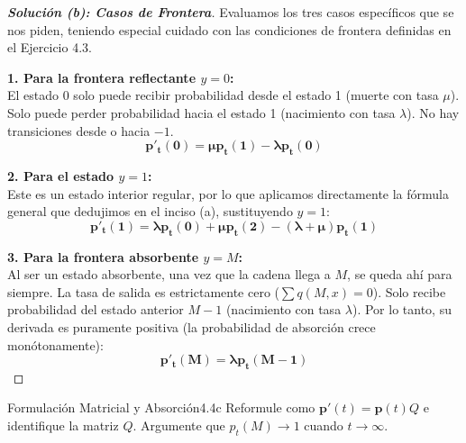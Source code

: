 \documentclass[10pt,a4paper]{article}
\begin{document}
\newpage

\begin{proof}[\textbf{Solución (b): Casos de Frontera}]
    Evaluamos los tres casos específicos que se nos piden, teniendo especial cuidado con las condiciones de frontera definidas en el Ejercicio 4.3.
    
    \textbf{1. Para la frontera reflectante $y = 0$:} \\
    El estado 0 solo puede recibir probabilidad desde el estado 1 (muerte con tasa $\mu$). 
    Solo puede perder probabilidad hacia el estado 1 (nacimiento con tasa $\lambda$). No hay transiciones desde o hacia $-1$.
    \[ \mathbf{p'_t(0) = \mu p_t(1) - \lambda p_t(0)} \]
    
    \textbf{2. Para el estado $y = 1$:} \\
    Este es un estado interior regular, por lo que aplicamos directamente la fórmula general que dedujimos en el inciso (a), sustituyendo $y=1$:
    \[ \mathbf{p'_t(1) = \lambda p_t(0) + \mu p_t(2) - (\lambda + \mu) p_t(1)} \]
    
    \textbf{3. Para la frontera absorbente $y = M$:} \\
    Al ser un estado absorbente, una vez que la cadena llega a $M$, se queda ahí para siempre. La tasa de salida es estrictamente cero ($\sum q(M, x) = 0$).
    Solo recibe probabilidad del estado anterior $M-1$ (nacimiento con tasa $\lambda$). Por lo tanto, su derivada es puramente positiva (la probabilidad de absorción crece monótonamente):
    \[ \mathbf{p'_t(M) = \lambda p_t(M-1)} \]
\end{proof}

\newpage

\vspace{5mm}

\begin{ejercicio}{Formulación Matricial y Absorción}{4.4c}
    Reformule como $\mathbf{p}'(t) = \mathbf{p}(t)Q$ e identifique la matriz $Q$. Argumente que $p_t(M) \to 1$ cuando $t \to \infty$.
\end{ejercicio}

\vspace{2mm}
\end{document}
